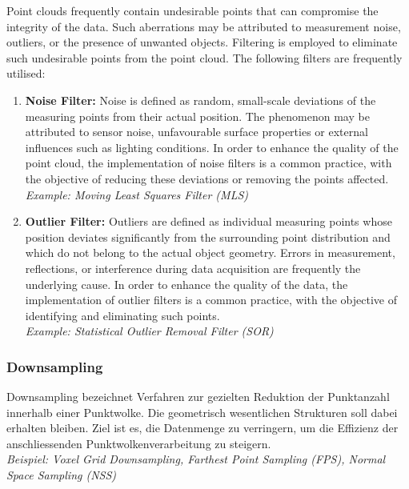 \begin{English}
    Point clouds frequently contain undesirable points that can compromise the integrity of the data. Such aberrations may be attributed to measurement noise, outliers, or the presence of unwanted objects. Filtering is employed to eliminate such undesirable points from the point cloud. The following filters are frequently utilised:

    \begin{enumerate}
        \item \textbf{Noise Filter:} Noise is defined as random, small-scale deviations of the measuring points from their actual position. The phenomenon may be attributed to sensor noise, unfavourable surface properties or external influences such as lighting conditions. In order to enhance the quality of the point cloud, the implementation of noise filters is a common practice, with the objective of reducing these deviations or removing the points affected. \cite{liu3DPointCloud2021}\\
        \textit{Example: Moving Least Squares Filter (MLS)}
        
        \item \textbf{Outlier Filter:} Outliers are defined as individual measuring points whose position deviates significantly from the surrounding point distribution and which do not belong to the actual object geometry. Errors in measurement, reflections, or interference during data acquisition are frequently the underlying cause. In order to enhance the quality of the data, the implementation of outlier filters is a common practice, with the objective of identifying and eliminating such points. \cite{liu3DPointCloud2021}\\
        \textit{Example: Statistical Outlier Removal Filter (SOR)}
    \end{enumerate}
\end{English}

\subsubsection{Downsampling}
\begin{German}
    Downsampling bezeichnet Verfahren zur gezielten Reduktion der Punktanzahl innerhalb einer Punktwolke. Die geometrisch wesentlichen Strukturen soll dabei erhalten bleiben. Ziel ist es, die Datenmenge zu verringern, um die Effizienz der anschliessenden Punktwolkenverarbeitung zu steigern. \cite{liu3DPointCloud2021}\\
    \textit{Beispiel: Voxel Grid Downsampling, Farthest Point Sampling (FPS), Normal Space Sampling (NSS)}
\end{German}

